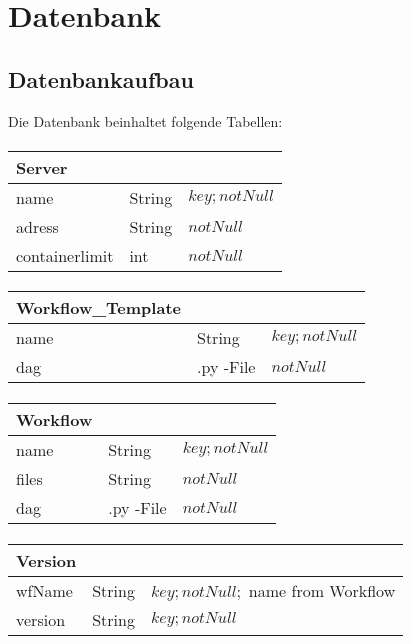 \section{Datenbank}

\subsection{Datenbankaufbau}
Die Datenbank beinhaltet folgende Tabellen:

\paragraph{}
\begin{tabular}{|p{4cm}|p{2cm}|p{6cm}|}
	\hline
	\textbf{Server} &  & \\
	\hline
	name & String & $key; notNull$ \\
	\hline
	adress & String & $notNull$\\
	\hline
	containerlimit & int & $notNull$\\
	\hline
\end{tabular}

\paragraph{}
\begin{tabular}{|p{4cm}|p{2cm}|p{6cm}|}
	\hline
	\textbf{Workflow\_Template} &  & \\
	\hline
	name & String & $key; notNull$ \\
	\hline
	dag & .py -File & $notNull$\\
	\hline
\end{tabular}

\paragraph{}
\begin{tabular}{|p{4cm}|p{2cm}|p{6cm}|}
	\hline
	\textbf{Workflow} &  & \\
	\hline
	name & String & $key; notNull$ \\
	\hline
	files & String & $notNull$ \\
	\hline
	dag & .py  -File & $notNull$\\
	\hline
\end{tabular}

\paragraph{}
\begin{tabular}{|p{4cm}|p{2cm}|p{6cm}|}
	\hline
	\textbf{Version} & & \\
	\hline
	wfName & String & $key; notNull;$ name from Workflow\\
	\hline
	version & String & $key; notNull$ \\
	\hline
\end{tabular}

